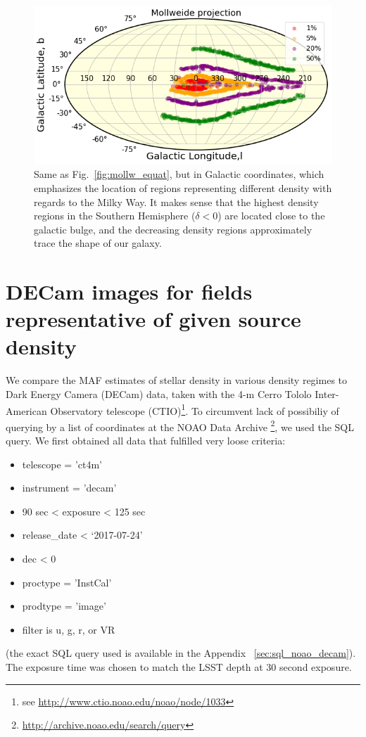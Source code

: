 \documentclass[DM,lsstdraft,toc,usenatbib]{lsstdoc}
\begin{document}
\begin{figure}
\includegraphics[width=1.0\columnwidth]{figs/Illustrate_density_regions_mollw_galactic.png}
\caption{Same as Fig.~\ref{fig:mollw_equat}, but in Galactic coordinates, which emphasizes the location of regions representing different density with regards to the Milky Way. It makes sense that the highest density regions in the Southern Hemisphere ($\delta < 0$) are located close to the galactic bulge, and the decreasing density regions approximately trace the shape of our galaxy.}
\label{fig:mollw_galactic}
\end{figure} 

\section{DECam images for fields representative of given source density }

We compare the MAF estimates of stellar density in various density regimes to Dark Energy Camera (DECam)  data, taken with the 4-m Cerro Tololo Inter-American Observatory telescope (CTIO)\footnote{see \url{http://www.ctio.noao.edu/noao/node/1033}}. To circumvent lack of possibiliy of querying by a list of coordinates  at the NOAO Data Archive \footnote{\url{http://archive.noao.edu/search/query}}, we used the SQL query.  We first obtained all data that fulfilled very loose criteria:
\begin{itemize}
\item telescope = 'ct4m'
\item instrument = 'decam'
\item 90 sec < exposure < 125 sec 
\item release\_date < ‘2017-07-24'
\item dec < 0 
\item proctype = 'InstCal' 
\item prodtype = 'image'
\item filter is  u, g, r,  or VR 
\end{itemize}
(the exact SQL query used is available in the Appendix ~\ref{sec:sql_noao_decam}). The exposure time was chosen to match the LSST depth at 30 second exposure.
\end{document}
